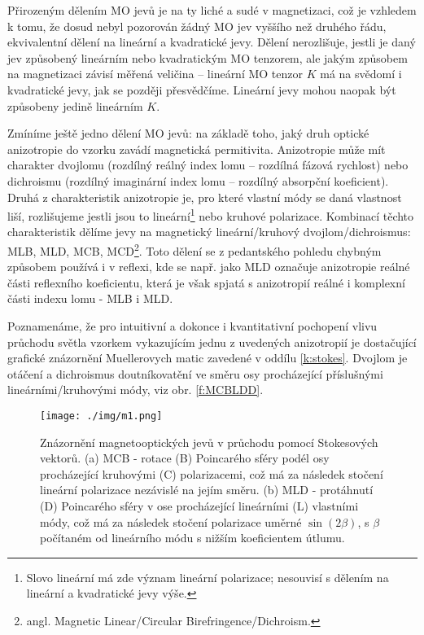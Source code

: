 Přirozeným dělením MO jevů je na ty liché a sudé v magnetizaci, což je vzhledem k tomu, že dosud nebyl pozorován žádný MO jev vyššího než druhého řádu, ekvivalentní dělení na lineární a kvadratické jevy.
Dělení nerozlišuje, jestli je daný jev způsobený lineárním nebo kvadratickým MO tenzorem, ale jakým způsobem na magnetizaci závisí měřená veličina -- lineární MO tenzor $K$ má na svědomí i kvadratické jevy, jak se později přesvědčíme.
Lineární jevy mohou naopak být způsobeny jedině lineárním $K$.

Zmíníme ještě jedno dělení MO jevů: na základě toho, jaký druh optické anizotropie do vzorku zavádí magnetická permitivita.
Anizotropie může mít charakter dvojlomu (rozdílný reálný index lomu -- rozdílná fázová rychlost) nebo dichroismu (rozdílný imaginární index lomu -- rozdílný absorpční koeficient).
Druhá z charakteristik anizotropie je, pro které vlastní módy se daná vlastnost liší, rozlišujeme jestli jsou to lineární\footnote{Slovo lineární má zde význam lineární polarizace; nesouvisí s dělením na lineární a kvadratické jevy výše.} nebo kruhové polarizace.
Kombinací těchto charakteristik dělíme jevy na magnetický lineární/kruhový dvojlom/dichroismus: MLB, MLD, MCB, MCD\footnote{angl. Magnetic Linear/Circular Birefringence/Dichroism.}\cite{ZvezdinKotov}.
Toto dělení se z pedantského pohledu chybným způsobem používá i v reflexi, kde se např. jako MLD označuje anizotropie reálné části reflexního koeficientu, která je však spjatá s anizotropií reálné i komplexní části indexu lomu - MLB i MLD. \cite{systematicgamnas}

Poznamenáme, že pro intuitivní a dokonce i kvantitativní pochopení vlivu průchodu světla vzorkem vykazujícím jednu z uvedených anizotropií je dostačující grafické znázornění Muellerovych matic zavedené v oddílu \ref{k:stokes}.
Dvojlom je otáčení a dichroismus doutníkovatění ve směru osy procházející příslušnými lineárními/kruhovými módy, viz obr. \ref{f:MCBLDD}.

\begin{figure}\centering
\texttt{[image: ./img/m1.png]}
\caption{Znázornění magnetooptických jevů v průchodu pomocí Stokesových vektorů. (a) MCB - rotace (B) Poincarého sféry podél osy procházející kruhovými (C) polarizacemi, což má za následek stočení lineární polarizace nezávislé na jejím směru. (b) MLD - protáhnutí (D) Poincarého sféry v ose procházející lineárními (L) vlastními módy, což má za následek stočení polarizace uměrné $\sin(2\beta)$, s $\beta$ počítaném od lineárního módu s nižším koeficientem útlumu.}\label{f:MCBMLD}
\end{figure}

